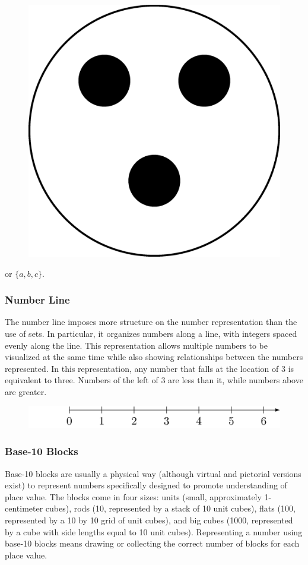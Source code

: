 \documentclass[
]{book}
\theoremstyle{definition}
\theoremstyle{definition}
\theoremstyle{definition}
\theoremstyle{definition}
\theoremstyle{remark}
\begin{document}
\begin{figure}

{\centering \includegraphics[width=0.2\linewidth]{tikz/Set-representations} 

}

\end{figure}

or \(\{a,b,c\}\).

\hypertarget{number-line}{%
\subsubsection*{Number Line}\label{number-line}}

The number line imposes more structure on the number representation than the use of sets. In particular, it organizes numbers along a line, with integers spaced evenly along the line. This representation allows multiple numbers to be visualized at the same time while also showing relationships between the numbers represented. In this representation, any number that falls at the location of 3 is equivalent to three. Numbers of the left of 3 are less than it, while numbers above are greater.

\begin{figure}

{\centering \includegraphics[width=0.8\linewidth]{tikz/number-line-representation} 

}

\end{figure}

\hypertarget{base-10-blocks}{%
\subsubsection*{Base-10 Blocks}\label{base-10-blocks}}

Base-10 blocks are usually a physical way (although virtual and pictorial versions exist) to represent numbers specifically designed to promote understanding of place value. The blocks come in four sizes: units (small, approximately 1-centimeter cubes), rods (10, represented by a stack of 10 unit cubes), flats (100, represented by a 10 by 10 grid of unit cubes), and big cubes (1000, represented by a cube with side lengths equal to 10 unit cubes). Representing a number using base-10 blocks means drawing or collecting the correct number of blocks for each place value.
\end{document}
